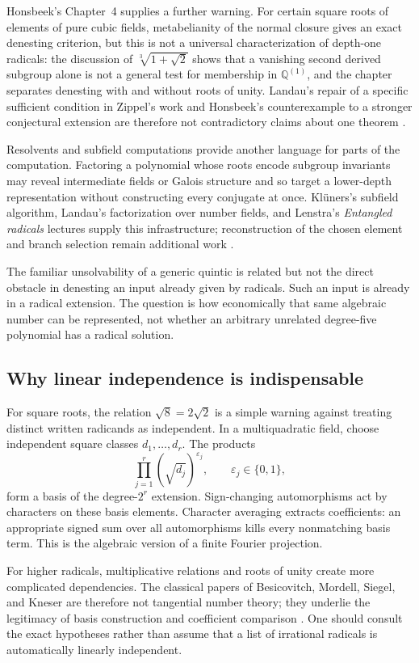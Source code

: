 \documentclass[11pt,oneside]{article}
\numberwithin{equation}{section}
\theoremstyle{definition}
\theoremstyle{remark}
\newcommand{\Q}{\mathbb{Q}}
\begin{document}
Honsbeek's Chapter~4 supplies a further warning. For certain square roots of elements of pure cubic fields, metabelianity of the normal closure gives an exact denesting criterion, but this is not a universal characterization of depth-one radicals: the discussion of $\sqrt[3]{1+\sqrt2}$ shows that a vanishing second derived subgroup alone is not a general test for membership in $\Q^{(1)}$, and the chapter separates denesting with and without roots of unity. Landau's repair of a specific sufficient condition in Zippel's work and Honsbeek's counterexample to a stronger conjectural extension are therefore not contradictory claims about one theorem \cite{honsbeek,landauzippel}.

Resolvents and subfield computations provide another language for parts of the computation. Factoring a polynomial whose roots encode subgroup invariants may reveal intermediate fields or Galois structure and so target a lower-depth representation without constructing every conjugate at once. Kl\"uners's subfield algorithm, Landau's factorization over number fields, and Lenstra's \emph{Entangled radicals} lectures supply this infrastructure; reconstruction of the chosen element and branch selection remain additional work \cite{kluners,landaufactor,lenstra06,pari,cohen}.

The familiar unsolvability of a generic quintic is related but not the direct obstacle in denesting an input already given by radicals. Such an input is already in a radical extension. The question is how economically that same algebraic number can be represented, not whether an arbitrary unrelated degree-five polynomial has a radical solution.

\subsection{Why linear independence is indispensable}
For square roots, the relation $\sqrt8=2\sqrt2$ is a simple warning against treating distinct written radicands as independent. In a multiquadratic field, choose independent square classes $d_1,\ldots,d_r$. The products
\[
\prod_{j=1}^r(\sqrt{d_j})^{\varepsilon_j},\qquad
\varepsilon_j\in\{0,1\},
\]
form a basis of the degree-$2^r$ extension. Sign-changing automorphisms act by characters on these basis elements. Character averaging extracts coefficients: an appropriate signed sum over all automorphisms kills every nonmatching basis term. This is the algebraic version of a finite Fourier projection.

For higher radicals, multiplicative relations and roots of unity create more complicated dependencies. The classical papers of Besicovitch, Mordell, Siegel, and Kneser are therefore not tangential number theory; they underlie the legitimacy of basis construction and coefficient comparison \cite{besicovitch,mordell,siegel,kneser}. One should consult the exact hypotheses rather than assume that a list of irrational radicals is automatically linearly independent.
\end{document}
